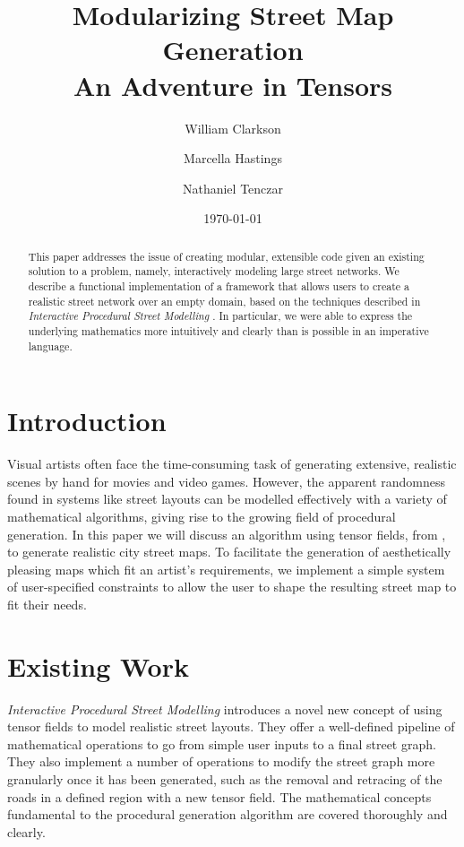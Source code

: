 \documentclass[twocolumn]{article}
\title{Modularizing Street Map Generation \\
    \vspace{8pt} \large An Adventure in Tensors}
\author{William Clarkson \and Marcella Hastings \and Nathaniel Tenczar}
\date{\today}
\begin{document}
\maketitle

\begin{abstract}
This paper addresses the issue of creating modular, extensible code given an
existing solution to a problem, namely, interactively modeling large street
networks. We describe a functional implementation of a framework that allows
users to create a realistic street network over an empty domain, based on the
techniques described in \textit{Interactive Procedural Street Modelling}
\cite{chen}. In particular, we were able to express the underlying mathematics
more intuitively and clearly than is possible in an imperative language.
\end{abstract}

\section{Introduction}
Visual artists often face the time-consuming task of generating extensive,
realistic scenes by hand for movies and video games. However, the apparent
randomness found in systems like street layouts can be modelled effectively
with a variety of mathematical algorithms, giving rise to the growing field of
procedural generation. In this paper we will discuss an algorithm using tensor
fields, from \cite{chen}, to generate realistic city street maps. To facilitate
the generation of aesthetically pleasing maps which fit an artist's
requirements, we implement a simple system of user-specified constraints to
allow the user to shape the resulting street map to fit their needs.

\section{Existing Work}
\textit{Interactive Procedural Street Modelling} \cite{chen} introduces a novel
new concept of using tensor fields to model realistic street layouts. They
offer a well-defined pipeline of mathematical operations to go from simple user
inputs to a final street graph. They also implement a number of operations to
modify the street graph more granularly once it has been generated, such as the
removal and retracing of the roads in a defined region with a new
tensor field. The mathematical concepts fundamental to the procedural
generation algorithm are covered thoroughly and clearly.
\end{document}
